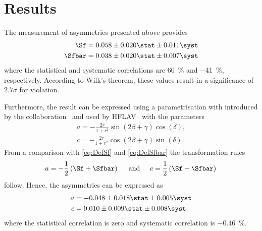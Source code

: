 \chapter{Results}

The measurement of \CP asymmetries presented above provides
\begin{equation}
\begin{aligned}
\Sf&=0.058\pm0.020\stat\pm0.011\syst\\
\Sfbar&=0.038\pm0.020\stat\pm0.007\syst
\end{aligned}
\end{equation}
where the statistical and systematic correlations are \SI{60}{\percent} and \SI{-41}{\percent}, respectively.
According to Wilk's theorem, these values result in a significance of $2.7\sigma$ for \mbox{\CP violation}.

Furthermore, the result can be expressed using a parametrisation with introduced by the \babar collaboration~\cite{Aubert:2006tw} and used by HFLAV~\cite{HFLAV2016} with the parameters
\begin{equation}
\begin{aligned}
a=-\frac{2r}{1+r^2}\sin\!\left(2\beta+\gamma\right)\cos\!\left(\delta\right),\\
c=-\frac{2r}{1+r^2}\cos\!\left(2\beta+\gamma\right)\sin\!\left(\delta\right).
\end{aligned}
\end{equation}
From a comparison with \cref{eq:DefSf} and \eqref{eq:DefSfbar} the transformation rules
\begin{equation}
a=-\frac{1}{2}\left(\Sf+\Sfbar\right)\hspace{0.5cm}\text{and}\hspace{0.5cm}c=\frac{1}{2}\left(\Sf-\Sfbar\right)\\
\end{equation}
follow.
Hence, the \CP asymmetries can be expressed as
\begin{equation}
\begin{aligned}
a&=-0.048\pm0.018\stat\pm0.005\syst\\
c&=0.010\pm0.009\stat\pm0.008\syst\\
\end{aligned}
\end{equation}
where the statistical correlation is zero and systematic correlation is \SI{-0.46}{\percent}.

